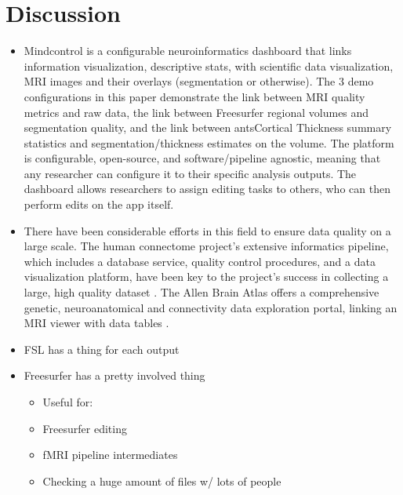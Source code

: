 \section{Discussion}

\begin{itemize}
\item Mindcontrol is a configurable neuroinformatics dashboard that links information visualization, descriptive stats, with scientific data visualization, MRI images and their overlays (segmentation or otherwise). The 3 demo configurations in this paper demonstrate the link between MRI quality metrics and raw data, the link between Freesurfer regional volumes and segmentation quality, and the link between antsCortical Thickness summary statistics and segmentation/thickness estimates on the volume. The platform is configurable, open-source, and software/pipeline agnostic, meaning that any researcher can configure it to their specific analysis outputs. The dashboard allows researchers to assign editing tasks to others, who can then perform edits on the app itself. 
\item There have been considerable efforts in this field to ensure data quality on a large scale. The human connectome project's extensive informatics pipeline, which includes a database service, quality control procedures, and a data visualization platform, have been key to the project's success in collecting a large, high quality dataset \cite{Marcus_2013}. The Allen Brain Atlas offers a comprehensive genetic, neuroanatomical and connectivity data exploration portal, linking an MRI viewer with data tables \cite{Sunkin_2012}.  %
\item FSL has a thing for each output
\item Freesurfer has a pretty involved thing
    \begin{itemize}
    \item Useful for:
    \item Freesurfer editing
    \item fMRI pipeline intermediates
    \item Checking a huge amount of files w/ lots of people
    \end{itemize}
\end{itemize}



